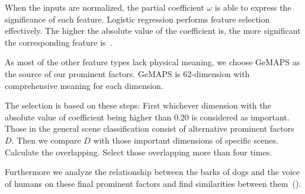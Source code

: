 When the inputs are normalized, the partial coefficient $\omega$ is able to express the significance of each feature. Logistic regression performs feature selection effectively. The higher the absolute value of the coefficient is, the more significant the corresponding feature is~\cite{feat1}.

As most of the other feature types lack physical meaning, we choose GeMAPS as the source of our prominent factors. GeMAPS is 62-dimension with comprehensive meaning for each dimension. 

The selection is based on these steps: First whichever dimension with the absolute value of coefficient being higher than 0.20 is considered as important. Those in the general scene classification consist of alternative prominent factors $D$. Then we compare $D$ with those important dimensions of specific scenes. Calculate the overlapping. Select those overlapping more than four times.

Furthermore we analyze the relationship between the barks of dogs and the voice of humans on these final prominent factors and find similarities between them~().
